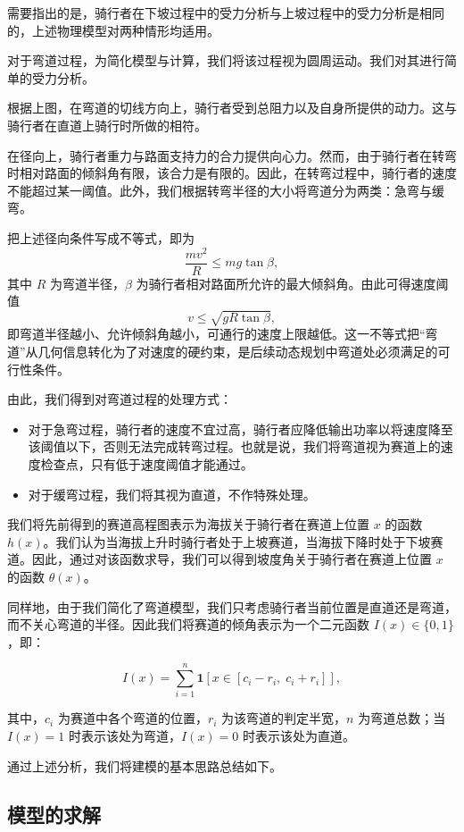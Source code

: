 \documentclass[11pt,a4paper]{ctexart}
\begin{document}
需要指出的是，骑行者在下坡过程中的受力分析与上坡过程中的受力分析是相同的，上述物理模型对两种情形均适用。

对于弯道过程，为简化模型与计算，我们将该过程视为圆周运动。我们对其进行简单的受力分析。

根据上图，在弯道的切线方向上，骑行者受到总阻力以及自身所提供的动力。这与骑行者在直道上骑行时所做的相符。

在径向上，骑行者重力与路面支持力的合力提供向心力。然而，由于骑行者在转弯时相对路面的倾斜角有限，该合力是有限的。因此，在转弯过程中，骑行者的速度不能超过某一阈值。此外，我们根据转弯半径的大小将弯道分为两类：急弯与缓弯。

把上述径向条件写成不等式，即为
\[
\frac{m v^2}{R} \le m g \tan\beta ,
\]
其中 $R$ 为弯道半径，$\beta$ 为骑行者相对路面所允许的最大倾斜角。由此可得速度阈值
\[
v \le \sqrt{g R \tan\beta},
\]
即弯道半径越小、允许倾斜角越小，可通行的速度上限越低。这一不等式把“弯道”从几何信息转化为了对速度的硬约束，是后续动态规划中弯道处必须满足的可行性条件。

由此，我们得到对弯道过程的处理方式：

\begin{itemize}
\item 对于急弯过程，骑行者的速度不宜过高，骑行者应降低输出功率以将速度降至该阈值以下，否则无法完成转弯过程。也就是说，我们将弯道视为赛道上的速度检查点，只有低于速度阈值才能通过。
\item 对于缓弯过程，我们将其视为直道，不作特殊处理。
\end{itemize}

我们将先前得到的赛道高程图表示为海拔关于骑行者在赛道上位置 $x$ 的函数 $h(x)$。我们认为当海拔上升时骑行者处于上坡赛道，当海拔下降时处于下坡赛道。因此，通过对该函数求导，我们可以得到坡度角关于骑行者在赛道上位置 $x$ 的函数 $\theta(x)$。

同样地，由于我们简化了弯道模型，我们只考虑骑行者当前位置是直道还是弯道，而不关心弯道的半径。因此我们将赛道的倾角表示为一个二元函数 $I(x) \in \{0,1\}$，即：

\begin{equation}
I(x) = \sum_{i=1}^{n} \mathbf{1}\left[x \in \left[c_i - r_i,\; c_i + r_i\right]\right],
\end{equation}

其中，$c_i$ 为赛道中各个弯道的位置，$r_i$ 为该弯道的判定半宽，$n$ 为弯道总数；当 $I(x)=1$ 时表示该处为弯道，$I(x)=0$ 时表示该处为直道。

通过上述分析，我们将建模的基本思路总结如下。
﻿\subsection{模型的求解}
\end{document}
